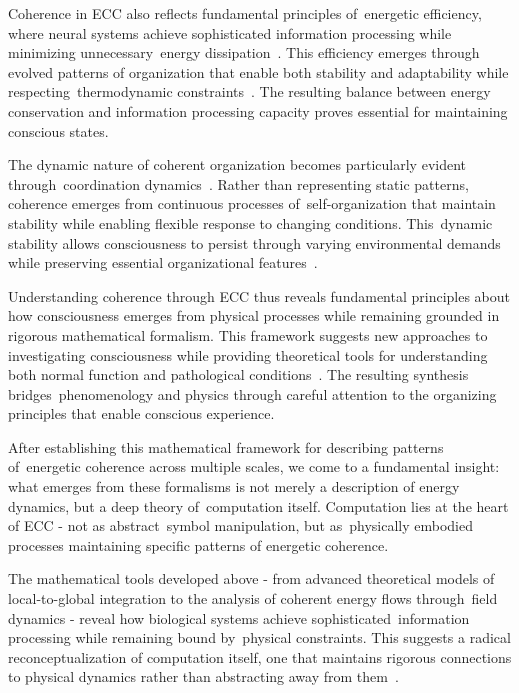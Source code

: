Coherence in ECC also reflects fundamental principles of~energetic efficiency, where neural systems achieve sophisticated information processing while minimizing unnecessary~energy dissipation~\cite{attwell2001, laughlin2001}. This efficiency emerges through evolved patterns of organization that enable both stability and adaptability while respecting~thermodynamic constraints~\cite{demetrius2015}. The resulting balance between energy conservation and information processing capacity proves essential for maintaining conscious states.

The dynamic nature of coherent organization becomes particularly evident through~coordination dynamics~\cite{kelso2012}. Rather than representing static patterns, coherence emerges from continuous processes of~self-organization that maintain stability while enabling flexible response to changing conditions. This~dynamic stability allows consciousness to persist through varying environmental demands while preserving essential organizational features~\cite{zheng2025unbearable}.

Understanding coherence through ECC thus reveals fundamental principles about how consciousness emerges from physical processes while remaining grounded in rigorous mathematical formalism. This framework suggests new approaches to investigating consciousness while providing theoretical tools for understanding both normal function and pathological conditions~\cite{pinotsis2023vivo}. The resulting synthesis bridges~phenomenology and physics through careful attention to the organizing principles that enable conscious experience.

After establishing this mathematical framework for describing patterns of~energetic coherence across multiple scales, we come to a fundamental insight: what emerges from these formalisms is not merely a description of energy dynamics, but a deep theory of~computation itself. Computation lies at the heart of ECC - not as abstract~symbol manipulation, but as~physically embodied processes maintaining specific patterns of energetic coherence.

The mathematical tools developed above - from advanced theoretical models of local-to-global integration to the analysis of coherent energy flows through~field dynamics - reveal how biological systems achieve sophisticated~information processing while remaining bound by~physical constraints. This suggests a radical reconceptualization of computation itself, one that maintains rigorous connections to physical dynamics rather than abstracting away from them~\cite{da2024mathematical}.

